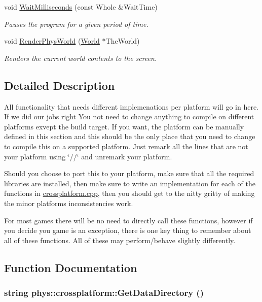 \begin{DoxyCompactItemize}
void \hyperlink{namespacephys_1_1crossplatform_ab5287fc10a132457a1309e1f5645347a}{WaitMilliseconds} (const Whole \&WaitTime)
\begin{DoxyCompactList}\small\item\em Pauses the program for a given period of time. \item\end{DoxyCompactList}\item 
void \hyperlink{namespacephys_1_1crossplatform_aa80d0a5289b00daad110fd29bf23c5e7}{RenderPhysWorld} (\hyperlink{classphys_1_1World}{World} $\ast$TheWorld)
\begin{DoxyCompactList}\small\item\em Renders the current world contents to the screen. \item\end{DoxyCompactList}\end{DoxyCompactItemize}


\subsection{Detailed Description}
All functionality that needs different implemenations per platform will go in here. If we did our jobs right You not need to change anything to compile on different platforms exvept the build target. If you want, the platform can be manually defined in this section and this should be the only place that you need to change to compile this on a supported platform. Just remark all the lines that are not your platform using \char`\"{}//\char`\"{} and unremark your platform. \par
\par
 Should you choose to port this to your platform, make sure that all the required libraries are installed, then make sure to write an implementation for each of the functions in \hyperlink{crossplatform_8cpp_source}{crossplatform.cpp}, then you should get to the nitty gritty of making the minor platforms inconsistencies work. \par
\par
 For most games there will be no need to directly call these functions, however if you decide you game is an exception, there is one key thing to remember about all of these functions. All of these may perform/behave slightly differently. 

\subsection{Function Documentation}
\hypertarget{namespacephys_1_1crossplatform_ac73c7f2db76ddfeb41723d72decc1366}{
\subsubsection[{GetDataDirectory}]{\setlength{\rightskip}{0pt plus 5cm}string phys::crossplatform::GetDataDirectory ()}}
\label{d4/d59/namespacephys_1_1crossplatform_ac73c7f2db76ddfeb41723d72decc1366}


